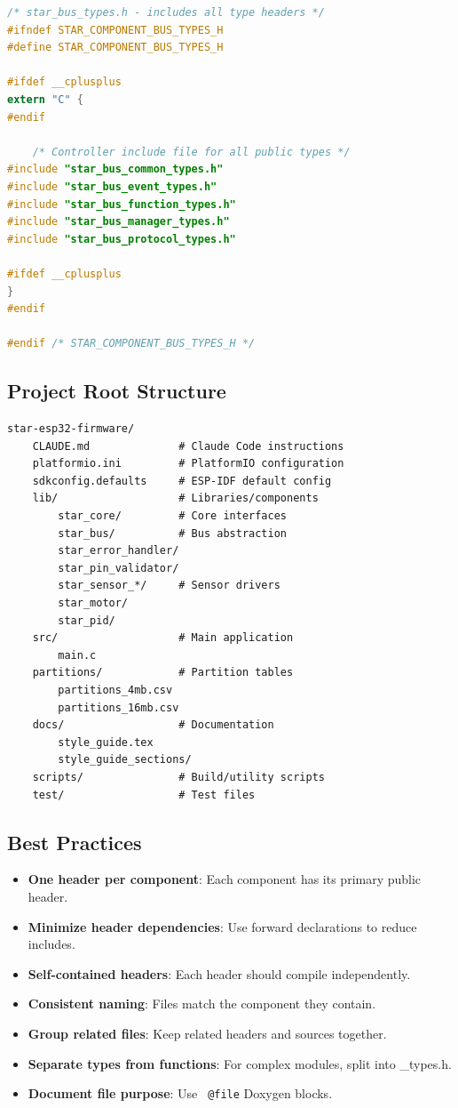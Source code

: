\begin{lstlisting}[language=C]
    /* star_bus_types.h - includes all type headers */
#ifndef STAR_COMPONENT_BUS_TYPES_H
#define STAR_COMPONENT_BUS_TYPES_H

#ifdef __cplusplus
extern "C" {
#endif

    /* Controller include file for all public types */
#include "star_bus_common_types.h"
#include "star_bus_event_types.h"
#include "star_bus_function_types.h"
#include "star_bus_manager_types.h"
#include "star_bus_protocol_types.h"

#ifdef __cplusplus
}
#endif

#endif /* STAR_COMPONENT_BUS_TYPES_H */
\end{lstlisting}

\subsection{Project Root Structure}

\begin{verbatim}
star-esp32-firmware/
    CLAUDE.md              # Claude Code instructions
    platformio.ini         # PlatformIO configuration
    sdkconfig.defaults     # ESP-IDF default config
    lib/                   # Libraries/components
        star_core/         # Core interfaces
        star_bus/          # Bus abstraction
        star_error_handler/
        star_pin_validator/
        star_sensor_*/     # Sensor drivers
        star_motor/
        star_pid/
    src/                   # Main application
        main.c
    partitions/            # Partition tables
        partitions_4mb.csv
        partitions_16mb.csv
    docs/                  # Documentation
        style_guide.tex
        style_guide_sections/
    scripts/               # Build/utility scripts
    test/                  # Test files
\end{verbatim}

\subsection{Best Practices}

\begin{itemize}
    \item \textbf{One header per component}: Each component has its primary public header.
    \item \textbf{Minimize header dependencies}: Use forward declarations to reduce includes.
    \item \textbf{Self-contained headers}: Each header should compile independently.
    \item \textbf{Consistent naming}: Files match the component they contain.
    \item \textbf{Group related files}: Keep related headers and sources together.
    \item \textbf{Separate types from functions}: For complex modules, split into \_types.h.
    \item \textbf{Document file purpose}: Use \texttt{
      @file} Doxygen blocks.
\end{itemize}



